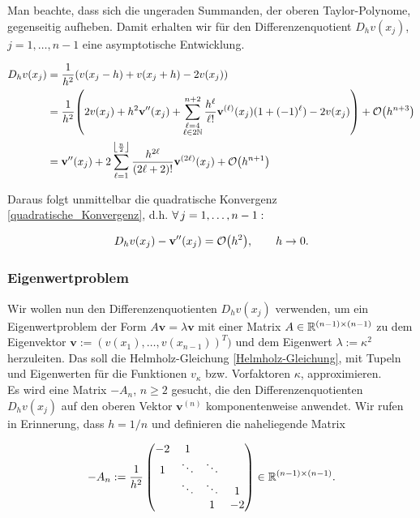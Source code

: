 Man beachte, dass sich die ungeraden Summanden, der oberen Taylor-Polynome, gegenseitig aufheben. Damit erhalten wir für den Differenzenquotient $D_h v(x_j)$, $j = 1, \ldots, n-1$ eine asymptotische Entwicklung.

\begin{align*}
  D_h v(x_j)
  & = \frac{1}{h^2} {\left ( 
    v(x_j - h) + v(x_j + h) - 2 v(x_j)
   \right )} \\
  & = \frac{1}{h^2} {\left ( 
        2 v(x_j) +
        h^2 \mathbf{v}^{\prime \prime}(x_j) +
        \sum_{\substack{\ell = 4 \\ \ell \in 2 \mathbb{N}}}^{n+2}
        \frac{h^\ell}{\ell !}
        \mathbf{v}^{(\ell)}(x_j)
        (1 + (-1)^\ell) -
        2 v(x_j)
       \right )} +
      \mathcal{O} {\left ( h^{n+3} \right )} \\
  & = \mathbf{v}^{\prime \prime}(x_j) +
      2 \sum_{\ell = 1}^{\left \lfloor \frac{n}{2} \right \rfloor}
      \frac{h^{2 \ell}}{(2 \ell + 2)!}
      \mathbf{v}^{(2 \ell)}(x_j) +
      \mathcal{O} {\left ( h^{n+1} \right )}
\end{align*}

Daraus folgt unmittelbar die quadratische Konvergenz \eqref{quadratische_Konvergenz}, d.h. $\forall \, j = 1, \ldots, n-1:$

\begin{align*}
  D_h v(x_j) - \mathbf{v}^{\prime \prime}(x_j) = \mathcal{O} {\left ( h^2 \right )}, \qquad
  h \to 0.
\end{align*}

\subsubsection{Eigenwertproblem}

Wir wollen nun den Differenzenquotienten $D_h v(x_j)$ verwenden, um ein Eigenwertproblem der Form $A \mathbf{v} = \lambda \mathbf{v}$ mit einer Matrix $A \in \mathbb{R}^{(n-1) \times (n-1)}$ zu dem Eigenvektor $\mathbf{v} := (v(x_1), \ldots, v(x_{n-1}))^T)$ und dem Eigenwert $\lambda := \kappa^2$ herzuleiten. Das soll die Helmholz-Gleichung \eqref{Helmholz-Gleichung}, mit Tupeln und Eigenwerten für die Funktionen $v_\kappa$ bzw. Vorfaktoren $\kappa$, approximieren. \\

Es wird eine Matrix $-A_n$, $n \geq 2$ gesucht, die den Differenzenquotienten $D_h v(x_j)$ auf den oberen Vektor $\mathbf{v}^{(n)}$ komponentenweise anwendet. Wir rufen in Erinnerung, dass $h = 1/n$ und definieren die naheliegende Matrix

\begin{align*}
  -A_n :=
  \frac{1}{h^2}
  \begin{pmatrix}
    -2 &  1      &        &    \\
     1 &  \ddots & \ddots &    \\
       &  \ddots & \ddots &  1 \\
       &         & 1      & -2
  \end{pmatrix}
  \in \mathbb{R}^{(n-1) \times (n-1)}.
\end{align*}

